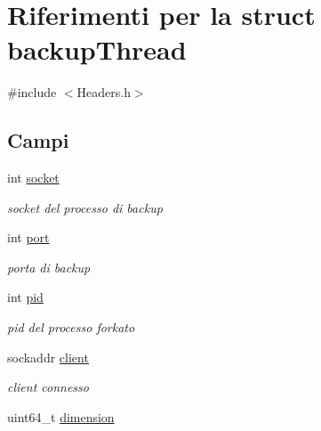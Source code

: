 \hypertarget{structbackupThread}{}\section{Riferimenti per la struct backup\+Thread}
\label{structbackupThread}


{\ttfamily \#include $<$Headers.\+h$>$}

\subsection*{Campi}
\begin{DoxyCompactItemize}
\item 
int \hyperlink{structbackupThread_a065d36d9bcf87a1285f2a6f0cac61c6f}{socket}\hypertarget{structbackupThread_a065d36d9bcf87a1285f2a6f0cac61c6f}{}\label{structbackupThread_a065d36d9bcf87a1285f2a6f0cac61c6f}

\begin{DoxyCompactList}\small\item\em socket del processo di backup \end{DoxyCompactList}\item 
int \hyperlink{structbackupThread_af2351e344c69cac9f9cec25503504c40}{port}\hypertarget{structbackupThread_af2351e344c69cac9f9cec25503504c40}{}\label{structbackupThread_af2351e344c69cac9f9cec25503504c40}

\begin{DoxyCompactList}\small\item\em porta di backup \end{DoxyCompactList}\item 
int \hyperlink{structbackupThread_a385b50e0e05fac52e30c0dbfd837c3b1}{pid}\hypertarget{structbackupThread_a385b50e0e05fac52e30c0dbfd837c3b1}{}\label{structbackupThread_a385b50e0e05fac52e30c0dbfd837c3b1}

\begin{DoxyCompactList}\small\item\em pid del processo forkato \end{DoxyCompactList}\item 
sockaddr \hyperlink{structbackupThread_a86db0548187afea43b4f5cd51591e4a5}{client}\hypertarget{structbackupThread_a86db0548187afea43b4f5cd51591e4a5}{}\label{structbackupThread_a86db0548187afea43b4f5cd51591e4a5}

\begin{DoxyCompactList}\small\item\em client connesso \end{DoxyCompactList}\item 
uint64\+\_\+t \hyperlink{structbackupThread_a7dece56978ea646f0a22d5d2a03a004e}{dimension}\hypertarget{structbackupThread_a7dece56978ea646f0a22d5d2a03a004e}{}\label{structbackupThread_a7dece56978ea646f0a22d5d2a03a004e}


\end{DoxyCompactItemize}
